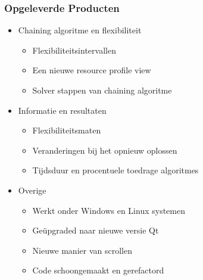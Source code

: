 \begin{frame}\frametitle{Opgeleverde Producten}
\begin{itemize}
	\item Chaining algoritme en flexibiliteit
	\begin{itemize}
		\item Flexibiliteitsintervallen
		\item Een nieuwe resource profile view
		\item Solver stappen van chaining algoritme
	\end{itemize}
	
	\item Informatie en resultaten
	\begin{itemize}
		\item Flexibiliteitsmaten
		\item Veranderingen bij het opnieuw oplossen
		\item Tijdsduur en procentuele toedrage algoritmes
	\end{itemize}
	
	\item Overige
	\begin{itemize}
		\item Werkt onder Windows en Linux systemen
		\item Ge\"upgraded naar nieuwe versie Qt
		\item Nieuwe manier van scrollen
		\item Code schoongemaakt en gerefactord
	\end{itemize}
\end{itemize}
\end{frame}

